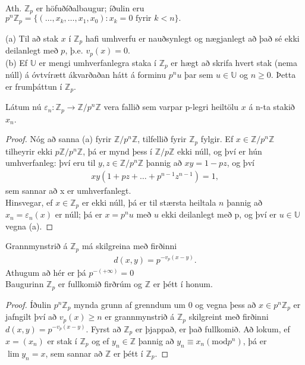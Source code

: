 Ath. $\mathbb{Z}_p$ er höfuðíðalbaugur; íðulin eru \\ $p^n \mathbb{Z}_p 
= \{(\ldots , x_k, \ldots, x_1, x_0): x_k = 0 \mbox{ fyrir } k<n \}.$
\begin{setn}
 (a) Til að stak $x$ í $\mathbb{Z}_p$ hafi umhverfu er nauðsynlegt og nægjanlegt 
að það sé ekki deilanlegt með $p$, þ.e. $v_p(x) = 0$.\\
 (b) Ef $\mathbb{U}$ er mengi umhverfanlegra staka í $\mathbb{Z}_p$ er hægt að 
skrifa hvert stak (nema núll) á óvtvírætt ákvarðaðan hátt á forminu $p^nu$ þar
 sem $u \in \mathbb{U}$ og $n\geq 0$. Þetta er frumþáttun í $\mathbb{Z}_p$.
\end{setn}
Látum nú $\varepsilon_n : \mathbb{Z}_p \rightarrow \mathbb{Z}/p^n 
\mathbb{Z}$ vera fallið sem varpar p-legri heiltölu $x$ á n-ta stakið $x_n$.
\begin{proof}
 Nóg að sanna (a) fyrir $\mathbb{Z}/p^n\mathbb{Z}$, tilfellið fyrir 
$\mathbb{Z}_p$ fylgir. Ef $x \in \mathbb{Z}/p^n\mathbb{Z}$ tilheyrir 
ekki $p\mathbb{Z}/p^n\mathbb{Z}$, þá er mynd þess í 
$\mathbb{Z}/p\mathbb{Z}$ ekki núll, og því er hún umhverfanleg: 
því eru til $y,z \in \mathbb{Z}/p^n\mathbb{Z}$ þannig að 
$xy = 1-pz$, og því 
\begin{align*}
 xy(1+pz+\ldots+p^{n-1}z^{n-1}) = 1,
\end{align*}
sem sannar að x er umhverfanlegt.\\
Hinsvegar, ef $x \in \mathbb{Z}_p$ er ekki núll, þá er til stærsta heiltala 
$n$ þannig að $x_n = \varepsilon_n(x)$ er núll; þá er $x = p^nu$ með $u$ ekki 
deilanlegt með p, og því er $u \in \mathbb{U}$ vegna (a). 
\end{proof}
\begin{setn}
 Grannmynstrið á $\mathbb{Z}_p$ má skilgreina með firðinni
\begin{align}
 d(x,y) = p^{-v_p(x-y)}.
\end{align}
Athugum að hér er þá $p^{-(+\infty)} = 0$ \\
Baugurinn $\mathbb{Z}_p$ er fullkomið firðrúm og $\mathbb{Z}$  er þétt 
í honum.
\end{setn}
\begin{proof}
 Íðulin $p^n \mathbb{Z}_p$ mynda grunn af grenndum um 0 og vegna þess að 
$x \in p^n \mathbb{Z}_p$ er jafngilt því að $v_p(x) \geq n$ er grannmynstrið 
á $\mathbb{Z}_p$ skilgreint með firðinni $d(x,y) = p^{-v_p(x-y)}$. 
Fyrst að $\mathbb{Z}_p$ er þjappað, er það fullkomið. Að lokum, ef $x = (x_n)$
 er stak í $\mathbb{Z}_p$ og ef $y_n \in \mathbb{Z}$ þannig að 
$y_n \equiv x_n(\mbox{mod} p^n)$, þá er $\lim y_n = x$, sem sannar að $\mathbb{Z}$ 
er þétt í $\mathbb{Z}_p$.
\end{proof}

